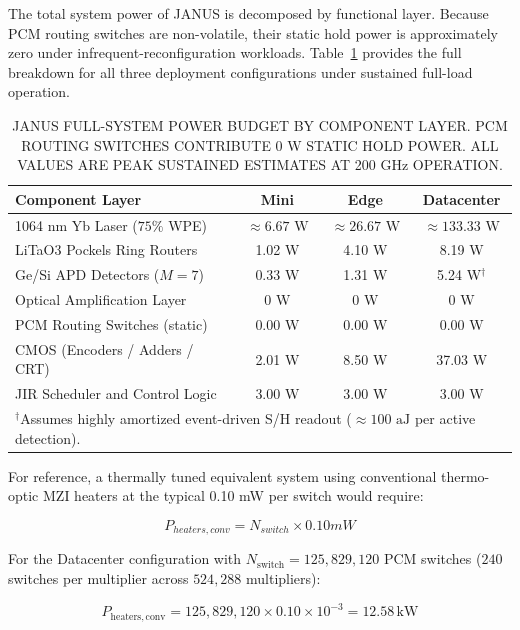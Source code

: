 \documentclass[journal]{IEEEtran}
\begin{document}
The total system power of JANUS is decomposed by functional layer. Because PCM routing switches are non-volatile, their static hold power is approximately zero under infrequent-reconfiguration workloads. Table~\ref{tab:table15} provides the full breakdown for all three deployment configurations under sustained full-load operation.

\begin{table}[htbp]
\centering
\small
\setlength{\tabcolsep}{1pt}
\caption{JANUS FULL-SYSTEM POWER BUDGET BY COMPONENT LAYER. PCM ROUTING SWITCHES CONTRIBUTE 0 W STATIC HOLD POWER. ALL VALUES ARE PEAK SUSTAINED ESTIMATES AT 200 GHz OPERATION.}
\label{tab:table15}
\begin{tabular}{lccc}
\toprule
Component Layer & Mini & Edge & Datacenter \\
\midrule
1064 nm Yb Laser ($75\%$ WPE) & $\approx 6.67\text{ W}$ & $\approx 26.67\text{ W}$ & $\approx 133.33\text{ W}$ \\
LiTaO3 Pockels Ring Routers & 1.02 W & 4.10 W & 8.19 W \\
Ge/Si APD Detectors ($M = 7$) & 0.33 W & 1.31 W & 5.24 W$^\dagger$ \\
Optical Amplification Layer & 0 W & 0 W & 0 W \\
PCM Routing Switches (static) & 0.00 W & 0.00 W & 0.00 W \\
CMOS (Encoders / Adders / CRT) & 2.01 W & 8.50 W & 37.03 W \\
JIR Scheduler and Control Logic & 3.00 W & 3.00 W & 3.00 W \\
\bottomrule
\multicolumn{4}{l}{\scriptsize $^\dagger$Assumes highly amortized event-driven S/H readout ($\approx 100\text{ aJ}$ per active detection).} \\
\end{tabular}
\end{table}

For reference, a thermally tuned equivalent system using conventional thermo-optic MZI heaters at the typical 0.10 mW per switch would require:

\begin{equation}
P_{heaters,conv} = N_{switch} \times 0.10 mW
\end{equation}

For the Datacenter configuration with $N_{\mathrm{switch}} = 125,829,120$ PCM switches ($240$ switches per multiplier across $524,288$ multipliers):

\begin{equation}
P_{\mathrm{heaters,conv}} = 125,829,120 \times 0.10 \times 10^{-3} = 12.58\,\mathrm{kW}
\end{equation}
\end{document}
